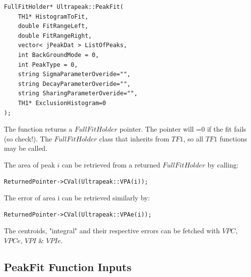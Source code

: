 \documentclass[a4paper,10pt]{article}
\begin{document}
\lstset{language=C++}
\begin{lstlisting}
FullFitHolder* Ultrapeak::PeakFit(
	TH1* HistogramToFit,
	double FitRangeLeft,
	double FitRangeRight,
	vector< jPeakDat > ListOfPeaks,
	int BackGroundMode = 0,
	int PeakType = 0,
	string SigmaParameterOveride="",
	string DecayParameterOveride="",
	string SharingParameterOveride="",
	TH1* ExclusionHistogram=0
);
\end{lstlisting}

The function returns a $FullFitHolder$ pointer. The pointer will =0 if the fit fails (so check!).
The $FullFitHolder$ class that inherits from $TF1$, so all $TF1$ functions may be called.

The area of peak $i$ can be retrieved from a returned $FullFitHolder$ by calling:
\lstset{language=C++}
\begin{lstlisting}
ReturnedPointer->CVal(Ultrapeak::VPA(i));
\end{lstlisting}

The error of area i can be retrieved similarly by:
\lstset{language=C++}
\begin{lstlisting}
ReturnedPointer->CVal(Ultrapeak::VPAe(i));
\end{lstlisting}

The centroids, "integral" and their respective errors can be fetched with $VPC$, $VPCe$, $VPI$ \& $VPIe$.


\subsection{PeakFit Function Inputs}
\end{document}
